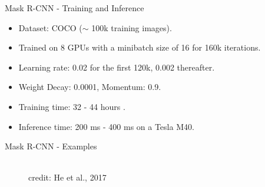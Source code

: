 \begin{frame} {Mask R-CNN - Training and Inference}
  \begin{itemize}
    \item Dataset: COCO ($\sim$ 100k training images).
    \item Trained on 8 GPUs with a minibatch size of 16 for 160k iterations.
    \item Learning rate: 0.02 for the first 120k, 0.002 thereafter.
    \item Weight Decay: 0.0001, Momentum: 0.9.
    \item Training time: 32 - 44 hours .
    \item Inference time: 200 ms - 400 ms on a Tesla M40.
  \end{itemize}
\end{frame}

\begin{frame} {Mask R-CNN - Examples}
   \begin{figure}
    \centering
      \tiny{\\credit: He et al., 2017}
  \end{figure}
\end{frame}


